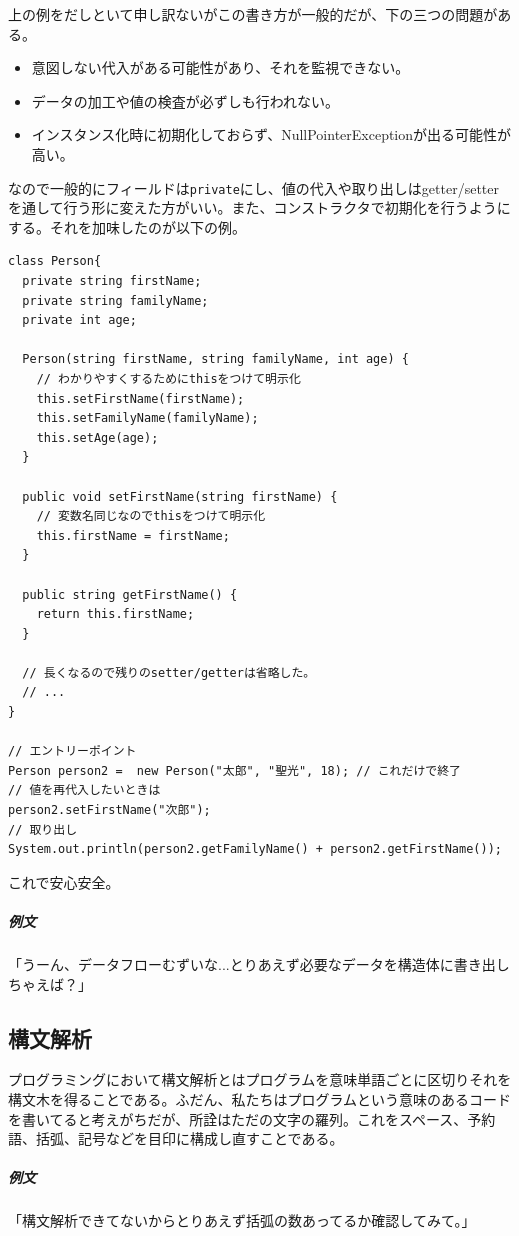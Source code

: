 \documentclass[dvipdfmx,jb5]{jreport}
\newcommand{\terlogy}[2][|]{\colorbox{terlogy}{\texttt{\lstinline#1#2#1}}}
\begin{document}
上の例をだしといて申し訳ないがこの書き方が一般的だが、下の三つの問題がある。
\begin{itemize}
      \item 意図しない代入がある可能性があり、それを監視できない。
      \item データの加工や値の検査が必ずしも行われない。
      \item インスタンス化時に初期化しておらず、NullPointerExceptionが出る可能性が高い。
\end{itemize}
なので一般的にフィールドは\terlogy{private}にし、値の代入や取り出しはgetter/setterを通して行う形に変えた方がいい。また、コンストラクタで初期化を行うようにする。それを加味したのが以下の例。

\lstset{language=Java}
\begin{lstlisting}
class Person{
  private string firstName;
  private string familyName;
  private int age;

  Person(string firstName, string familyName, int age) {
    // わかりやすくするためにthisをつけて明示化
    this.setFirstName(firstName);
    this.setFamilyName(familyName);
    this.setAge(age);
  }

  public void setFirstName(string firstName) {
    // 変数名同じなのでthisをつけて明示化
    this.firstName = firstName;
  }

  public string getFirstName() {
    return this.firstName;
  }

  // 長くなるので残りのsetter/getterは省略した。
  // ...
}

// エントリーポイント
Person person2 =  new Person("太郎", "聖光", 18); // これだけで終了
// 値を再代入したいときは
person2.setFirstName("次郎");
// 取り出し
System.out.println(person2.getFamilyName() + person2.getFirstName());
\end{lstlisting}
これで安心安全。

\subparagraph{例文} 「うーん、データフローむずいな...とりあえず必要なデータを構造体に書き出しちゃえば？」

\subsection{構文解析}
プログラミングにおいて構文解析とはプログラムを意味単語ごとに区切りそれを構文木を得ることである。ふだん、私たちはプログラムという意味のあるコードを書いてると考えがちだが、所詮はただの文字の羅列。これをスペース、予約語、括弧、記号などを目印に構成し直すことである。

\subparagraph{例文} 「構文解析できてないからとりあえず括弧の数あってるか確認してみて。」
\end{document}
